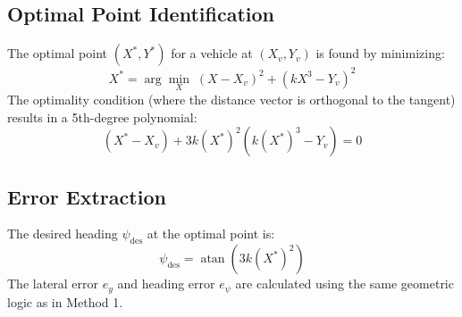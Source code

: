 \documentclass{article}
\begin{document}
\subsection{Optimal Point Identification}
The optimal point $(X^*, Y^*)$ for a vehicle at $(X_v, Y_v)$ is found by minimizing:
\begin{equation}
X^* = \arg \min_{X} \; (X - X_v)^2 + (k X^3 - Y_v)^2
\end{equation}
The optimality condition (where the distance vector is orthogonal to the tangent) results in a 5th-degree polynomial:
\begin{equation}
(X^* - X_v) + 3k(X^*)^2(k(X^*)^3 - Y_v) = 0
\end{equation}

\subsection{Error Extraction}
The desired heading $\psi_{\mathrm{des}}$ at the optimal point is:
\begin{equation}
\psi_{\mathrm{des}} = \operatorname{atan}(3k (X^*)^2)
\end{equation}
The lateral error $e_y$ and heading error $e_\psi$ are calculated using the same geometric logic as in Method 1.
\end{document}
